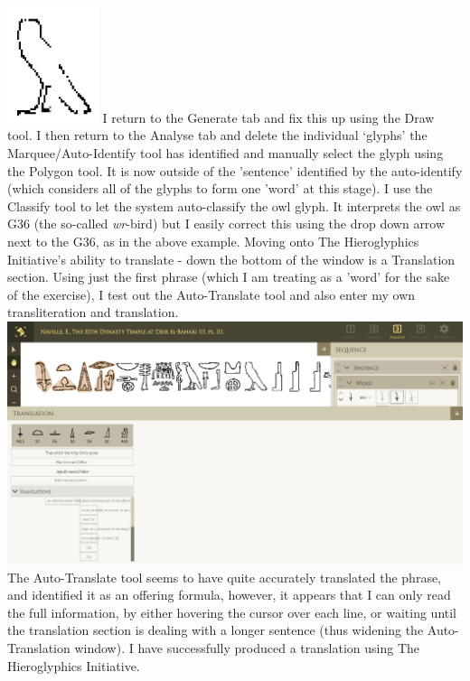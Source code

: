 \documentclass{article}
\begin{document}
\includegraphics[width=0.2\textwidth]{hiero_15.PNG}
\break \noindent
I return to the Generate tab and fix this up using the Draw tool. I then return to the Analyse tab and delete the individual `glyphs' the Marquee/Auto-Identify tool has identified and manually select the glyph using the Polygon tool. It is now outside of the 'sentence' identified by the auto-identify (which considers all of the glyphs to form one 'word' at this stage). I use the Classify tool to let the system auto-classify the owl glyph. It interprets the owl as G36 (the so-called \textit{wr}-bird) but I easily correct this using the drop down arrow next to the G36, as in the above example.
\newline \break \noindent
Moving onto The Hieroglyphics Initiative's ability to translate - down the bottom of the window is a Translation section. Using just the first phrase (which I am treating as a 'word' for the sake of the exercise), I test out the Auto-Translate tool and also enter my own transliteration and translation.
\newline \break
\includegraphics[width=1.0\textwidth]{hiero_16.PNG}
\break \noindent
The Auto-Translate tool seems to have quite accurately translated the phrase, and identified it as an offering formula, however, it appears that I can only read the full information, by either hovering the cursor over each line, or waiting until the translation section is dealing with a longer sentence (thus widening the Auto-Translation window). I have successfully produced a translation using The Hieroglyphics Initiative.
\end{document}

